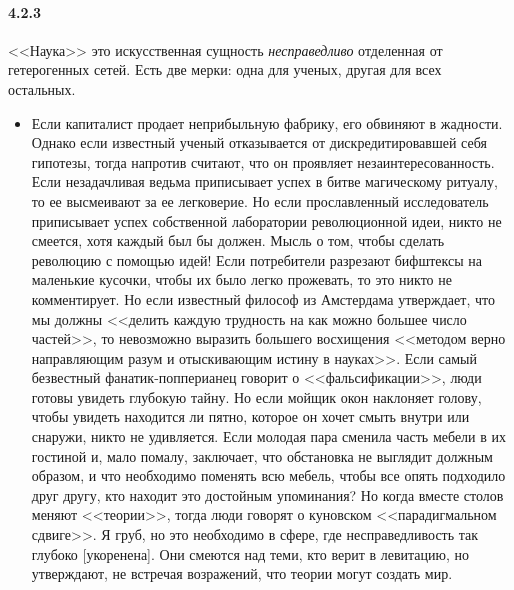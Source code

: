 \paragraph{4.2.3}\hypertarget{par:4.2.3}{} <<Наука>> это искусственная сущность {\itshape несправедливо} отделенная от гетерогенных сетей. Есть две мерки: одна для ученых, другая для всех остальных. 
	\begin{itemize}
	\item 
	Если капиталист продает неприбыльную фабрику, его обвиняют в жадности. Однако если известный ученый отказывается от дискредитировавшей себя гипотезы, тогда напротив считают, что он проявляет незаинтересованность. Если незадачливая ведьма приписывает успех в битве магическому ритуалу, то ее высмеивают за ее легковерие. Но если прославленный исследователь приписывает успех собственной лаборатории революционной идеи, никто не смеется, хотя каждый был бы должен. Мысль о том, чтобы сделать революцию с помощью идей! Если потребители разрезают бифштексы на маленькие кусочки, чтобы их было легко прожевать, то это никто не комментирует. Но если известный философ из Амстердама утверждает, что мы должны <<делить каждую трудность на как можно большее число частей>>, то невозможно выразить большего восхищения <<методом верно направляющим разум и отыскивающим истину в науках>>. Если самый безвестный фанатик-попперианец говорит о <<фальсификации>>, люди готовы увидеть глубокую тайну. Но если мойщик окон наклоняет голову, чтобы увидеть находится ли пятно, которое он хочет смыть внутри или снаружи, никто не удивляется. Если молодая пара сменила часть мебели в их гостиной и, мало помалу, заключает, что обстановка не выглядит должным образом, и что необходимо поменять всю мебель, чтобы все опять подходило друг другу, кто находит это достойным упоминания? Но когда вместе столов меняют <<теории>>, тогда люди говорят о куновском <<парадигмальном сдвиге>>. Я груб, но это необходимо в сфере, где несправедливость так глубоко [укоренена]. Они смеются над теми, кто верит в левитацию, но утверждают, не встречая возражений, что теории могут создать мир.
	\end{itemize}	


